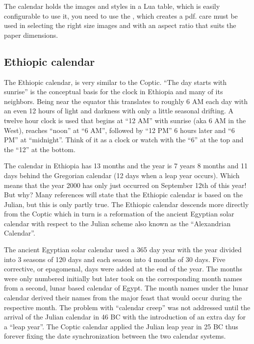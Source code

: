 The calendar holds the images and styles in  a Lua table, which is easily configurable to use it, you need to
use the \cmd{\makeCalendar}, which creates a pdf. care must be used in selecting the right size images and with an aspect ratio that suits the paper dimensions. 

\clearpage



\subsection{Ethiopic calendar}

The Ethiopic calendar, is very similar to the Coptic. “The day starts with sunrise” is the conceptual basis for the clock in Ethiopia and many of its neighbors. Being near the equator this translates to roughly 6 AM each day with an even 12 hours of light and darkness with only a little seasonal drifting. A twelve hour clock is used that begins at “12 AM” with sunrise (aka 6 AM in the West), reaches “noon” at “6 AM”, followed by “12 PM” 6 hours later and “6 PM” at “midnight”. Think of it as a clock or watch with the “6” at the top and the “12” at the bottom.

The calendar in Ethiopia has 13 months and the year is 7 years 8 months and 11 days behind the Gregorian calendar (12 days when a leap year occurs). Which means that the year 2000 has only just occurred on September 12th of this year! But why? Many references will state that the Ethiopic calendar is based on the Julian, but this is only partly true. The Ethiopic calendar descends more directly from the Coptic which in turn is a reformation of the ancient Egyptian solar calendar with respect to the Julian scheme also known as the “Alexandrian Calendar”.

The ancient Egyptian solar calendar used a 365 day year with the year divided into 3 seasons of 120 days and each season into 4 months of 30 days. Five corrective, or epagomenal, days were added at the end of the year. The months were only numbered initially but later took on the corresponding month names from a second, lunar based calendar of Egypt. The month names under the lunar calendar derived their names from the major feast that would occur during the respective month. The problem with “calendar creep” was not addressed until the arrival of the Julian calendar in 46 BC with the introduction of an extra day for a “leap year”. The Coptic calendar applied the Julian leap year in 25 BC thus forever fixing the date synchronization between the two calendar systems.

